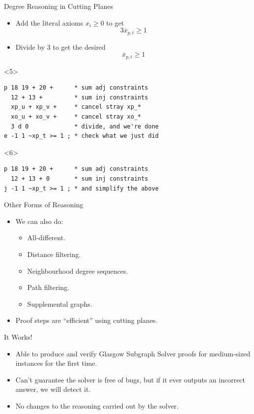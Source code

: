 \documentclass{beamer}
\newcommand{\vertexset}{\operatorname{V}}
\begin{document}
\begin{frame}[fragile]{Degree Reasoning in Cutting Planes}
{\begin{itemize}
\[    + \sum_{p \in \vertexset(P) \setminus \{q, r, s\}} -x_{p{,}v}
    \ge 1\]
\item Add the literal axioms $x_i \ge 0$ to get \[
    3 \overline{x}_{p{,}t} \ge 1\]
\item Divide by 3 to get the desired \[
    \overline{x}_{p{,}t} \ge 1\]
    \end{itemize}
}\begin{onlyenv}<5>
\begin{Verbatim}
p 18 19 + 20 +      * sum adj constraints
  12 + 13 +         * sum inj constraints
  xp_u + xp_v +     * cancel stray xp_*
  xo_u + xo_v +     * cancel stray xo_*
  3 d 0             * divide, and we're done
e -1 1 ~xp_t >= 1 ; * check what we just did
\end{Verbatim}
\end{onlyenv}\begin{onlyenv}<6>
\begin{Verbatim}
p 18 19 + 20 +      * sum adj constraints
  12 + 13 + 0       * sum inj constraints
j -1 1 ~xp_t >= 1 ; * and simplify the above
\end{Verbatim}
\end{onlyenv}
\end{frame}

\begin{frame}{Other Forms of Reasoning}
    \begin{itemize}
        \item We can also do:
            \begin{itemize}
                \item All-different.
                \item Distance filtering.
                \item Neighbourhood degree sequences.
                \item Path filtering.
                \item Supplemental graphs.
            \end{itemize}
        \item Proof steps are ``efficient'' using cutting planes.
    \end{itemize}
\end{frame}

\begin{frame}{It Works!}
    \begin{itemize}
        \item Able to produce and verify Glasgow Subgraph Solver proofs for medium-sized instances
            for the first time.
        \item Can't guarantee the solver is free of bugs, but if it ever outputs an incorrect
            answer, we will detect it.
        \item No changes to the reasoning carried out by the solver.
    \end{itemize}
\end{frame}
\end{document}
